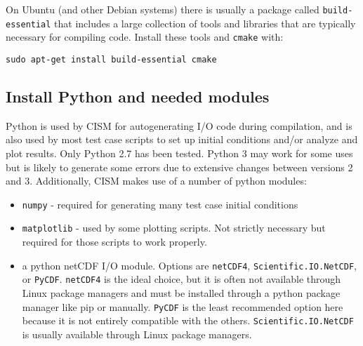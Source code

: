 \begin{mdframed}[style=ubuntu] %
On Ubuntu (and other Debian systems) there is usually a package called \texttt{build-essential} 
that includes a large collection of tools and libraries that are typically necessary
for compiling code. Install these tools and \texttt{cmake} with:

\texttt{sudo apt-get install build-essential cmake}
\end{mdframed}                 %




\subsection{Install Python and needed modules}
Python is used by CISM for autogenerating I/O code during compilation, and is also
used by most test case scripts to set up initial conditions and/or analyze and plot
results.  Only Python 2.7 has been tested.  Python 3 may work for some uses but is
likely to generate some errors due to extensive changes between versions 2 and 3.
Additionally, CISM makes use of a number of python modules:
\begin{itemize}
  \item \texttt{numpy} - required for generating many test case initial conditions
  \item \texttt{matplotlib} - used by some plotting scripts.  Not strictly necessary but required for those scripts to work properly.
  \item  a python netCDF I/O module.  Options are \texttt{netCDF4},  \texttt{Scientific.IO.NetCDF}, or \texttt{PyCDF}.  
\texttt{netCDF4} is the ideal choice, but it is often not available through Linux package managers and must be installed through a python package manager like pip or manually.
\texttt{PyCDF} is the least recommended option here because it is not entirely compatible with the others.  \texttt{Scientific.IO.NetCDF} is usually available through Linux package managers.
\end{itemize}


